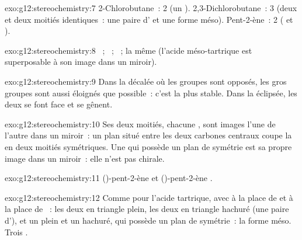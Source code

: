 \begin{solution}{exo:g12:stereochemistry:7}
2-Chlorobutane~: 2 (un ). 2,3-Dichlorobutane~: 3
(deux  et deux moitiés identiques~: une paire
d' et une forme méso). Pent-2-ène~: 2 ( et ).
\end{solution}

\begin{solution}{exo:g12:stereochemistry:8}
~; ~; ~; la même 
(l'acide méso-tartrique est superposable à son image dans un miroir).
\end{solution}

\begin{solution}{exo:g12:stereochemistry:9}
Dans la  décalée où les groupes  sont opposés, les
gros groupes sont aussi éloignés que possible~: c'est la plus stable.
Dans la  éclipsée, les deux  se font face et se
gênent.
\end{solution}

\begin{solution}{exo:g12:stereochemistry:10}
Ses deux moitiés, chacune , sont images l'une de l'autre
dans un miroir~: un plan situé entre les deux carbones centraux coupe la
 en deux moitiés symétriques. Une  qui possède un plan
de symétrie est sa propre image dans un miroir~: elle n'est pas chirale.
\end{solution}

\begin{solution}{exo:g12:stereochemistry:11}
()-pent-2-ène 
et ()-pent-2-ène .
\end{solution}

\begin{solution}{exo:g12:stereochemistry:12}
Comme pour l'acide tartrique, avec  à la place de  et
 à la place de ~: les deux  en triangle plein,
les deux en triangle hachuré (une paire d'), et un plein et
un hachuré, qui possède un plan de symétrie~: la forme méso. Trois
.
\end{solution}

